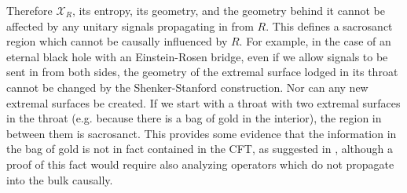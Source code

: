 \documentclass[12pt]{article}
\theoremstyle{remark}
\numberwithin{equation}{section}
\numberwithin{equation}{section}
\begin{document}


Therefore $\mathcal{X}_{R}$, its entropy, its geometry, and the geometry behind it cannot be affected by any unitary signals propagating in from $R$.  This defines a sacrosanct region which cannot be causally influenced by $R$.  For example, in the case of an eternal black hole with an Einstein-Rosen bridge, even if we allow signals to be sent in from both sides, the geometry of the extremal surface lodged in its throat cannot be changed by the Shenker-Stanford construction.  Nor can any new extremal surfaces be created.  If we start with a throat with two extremal surfaces in the throat (e.g. because there is a bag of gold \cite{Wheeler,  Hsu:2008yi} in the interior), the region in between them is sacrosanct.  This provides some evidence that the information in the bag of gold is not in fact contained in the CFT, as suggested in \cite{Freivogel:2005qh, Marolf:2008tx, Marolf:2012xe}, although a proof of this fact would require also analyzing operators which do not propagate into the bulk causally.
\end{document}

